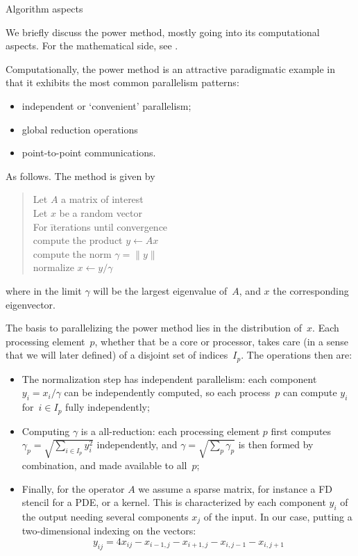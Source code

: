  {Algorithm aspects}


We briefly discuss the power method, mostly going into
its computational aspects.
For the mathematical side, see .

Computationally, the power method is an attractive paradigmatic example
in that it exhibits the most common parallelism patterns:
\begin{itemize}
\item independent or `convenient' parallelism;
\item global reduction operations
\item point-to-point communications.
\end{itemize}
As follows.
The method is given by
\begin{quote}
  \begin{tabbing}
    Let $A$ a matrix of interest\\
    Let $x$ be a random vector\\
    For \=iterations until convergence\\
    \> compute the product $y\leftarrow Ax$\\
    \> compute the norm $\gamma=\| y \|$\\
    \> normalize $x\leftarrow y/\gamma$\\
  \end{tabbing}
\end{quote}
where in the limit $\gamma$ will be the
largest eigenvalue of~$A$,
and $x$ the corresponding eigenvector.

The basis to parallelizing the power method lies in the distribution of~$x$.
Each processing element~$p$, whether that be a core or processor,
takes care (in a sense that we will later defined)
of a disjoint set of indices~$I_p$.
The operations then are:
\begin{itemize}
\item The normalization step has independent parallelism:
  each component $y_i=x_i/\gamma$ can be independently computed,
  so each process~$p$ can compute $y_i$ for~$i\in I_p$ fully independently;
\item Computing $\gamma$ is a all-reduction:
  each processing element $p$ first computes $\gamma_p=\sqrt{\sum_{i\in I_p}y_i^2}$
  independently,
  and $\gamma=\sqrt{\sum_p\gamma_p}$ is then formed by combination, and
  made available to all~$p$;
\item Finally, for the operator $A$ we assume a sparse matrix,
  for instance a \acf{FD} stencil for a \ac{PDE}, or a  kernel.
  This is characterized by each component $y_i$ of the output needing several
  components $x_j$ of the input. In our case, putting a two-dimensional
  indexing on the vectors:
  \[ y_{ij} = 4x_{ij} - x_{i-1,j} -x_{i+1,j} - x_{i,j-1} - x_{i,j+1} \]
\end{itemize}

